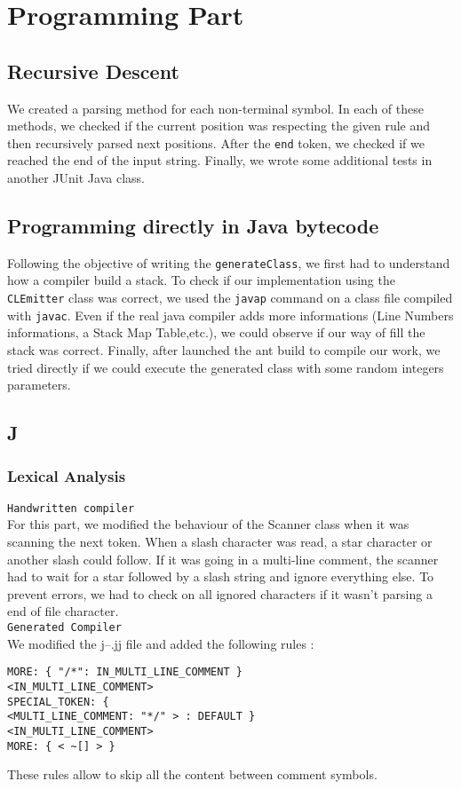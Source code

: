 \section{Programming Part}
\subsection{Recursive Descent}
We created a parsing method for each non-terminal symbol. In each of these methods, we checked if the current position was respecting the given rule and then recursively parsed next positions. After the \texttt{end} token, we checked if we reached the end of the input string. Finally, we wrote some additional tests in another JUnit Java class.

\subsection{Programming directly in Java bytecode}
Following the objective of writing the \texttt{generateClass}, we first had to understand how a compiler build a stack. To check if our implementation using the \texttt{CLEmitter} class was correct, we used the \texttt{javap} command on a class file compiled with \texttt{javac}. Even if the real java compiler adds more informations (Line Numbers informations, a Stack Map Table,etc.), we could observe if our way of fill the stack was correct. Finally, after launched the ant build to compile our work, we tried directly if we could execute the generated class with some random integers parameters. 

\subsection{J\-\-}
\subsubsection{Lexical Analysis}
\texttt{Handwritten compiler} \\
For this part, we modified the behaviour of the Scanner class when it was scanning the next token. When a slash character was read, a star character or another slash could follow. If it was going in a multi-line comment, the scanner had to wait for a star followed by a slash string and ignore everything else. To prevent errors, we had to check on all ignored characters if it wasn't parsing a end of file character.\\

\texttt{Generated Compiler} \\
We modified the j--.jj file and added the following rules :
\begin{verbatim}
MORE: { "/*": IN_MULTI_LINE_COMMENT } 
<IN_MULTI_LINE_COMMENT> 
SPECIAL_TOKEN: { 
<MULTI_LINE_COMMENT: "*/" > : DEFAULT } 
<IN_MULTI_LINE_COMMENT> 
MORE: { < ~[] > }
\end{verbatim}
These rules allow to skip all the content between comment symbols.


